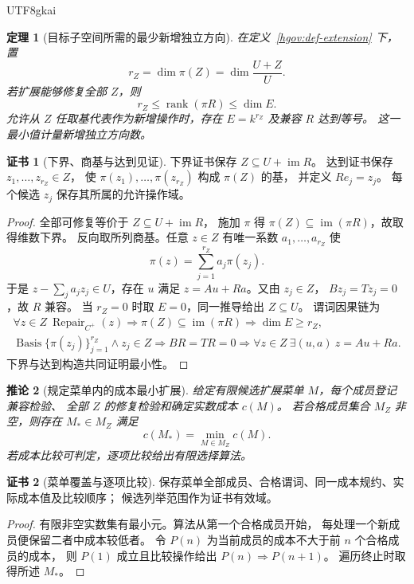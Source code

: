 \documentclass[12pt,a4paper,openany,notitlepage]{report}
\theoremstyle{plain}
\newtheorem{theorem}{定理}[chapter]
\newtheorem{corollary}[theorem]{推论}
\theoremstyle{definition}
\newtheorem*{certificate}{证书}
\theoremstyle{remark}
\def\mathcal#1{#1}\def\mathsf#1{#1}\def\mathbb#1{#1}%
\begin{document}
\begin{CJK*}{UTF8}{gkai}
\begin{theorem}[目标子空间所需的最少新增独立方向]
\label{hgov:thm-minimal-extension}
在定义~\ref{hgov:def-extension} 下，置
\[
 r_Z=\dim\pi(Z)
 =\dim\frac{U+Z}{U}.
\]
若扩展能够修复全部 $Z$，则
\[
 r_Z\le\operatorname{rank}(\pi R)\le\dim E.
\]
允许从 $Z$ 任取基代表作为新增操作时，存在
$E=\mathbb k^{r_Z}$ 及兼容 $R$ 达到等号。
这一最小值计量新增独立方向数。
\end{theorem}
\begin{certificate}[下界、商基与达到见证]
下界证书保存 $Z\subseteq U+\operatorname{im}R$。
达到证书保存 $z_1,\ldots,z_{r_Z}\in Z$，
使 $\pi(z_1),\ldots,\pi(z_{r_Z})$ 构成 $\pi(Z)$ 的基，
并定义 $Re_j=z_j$。
每个候选 $z_j$ 保存其所属的允许操作域。
\end{certificate}
\begin{proof}
全部可修复等价于 $Z\subseteq U+\operatorname{im}R$，
施加 $\pi$ 得
$\pi(Z)\subseteq\operatorname{im}(\pi R)$，故取得维数下界。
反向取所列商基。任意 $z\in Z$ 有唯一系数
$a_1,\ldots,a_{r_Z}$ 使
\[
 \pi(z)=\sum_{j=1}^{r_Z}a_j\pi(z_j).
\]
于是 $z-\sum_j a_jz_j\in U$，存在 $u$ 满足
$z=Au+Ra$。又由 $z_j\in Z$，
$Bz_j=Tz_j=0$，故 $R$ 兼容。
当 $r_Z=0$ 时取 $E=0$，同一推导给出 $Z\subseteq U$。
谓词因果链为
\[
 \begin{gathered}
 \forall z\in Z\ \operatorname{Repair}_{C^+}(z)
 \Longrightarrow
 \pi(Z)\subseteq\operatorname{im}(\pi R)
 \Longrightarrow \dim E\ge r_Z,\\
 \operatorname{Basis}\{\pi(z_j)\}_{j=1}^{r_Z}
 \wedge z_j\in Z
 \Longrightarrow BR=TR=0
 \Longrightarrow
 \forall z\in Z\ \exists(u,a)\ z=Au+Ra.
 \end{gathered}
\]
下界与达到构造共同证明最小性。
\end{proof}

\begin{corollary}[规定菜单内的成本最小扩展]
\label{hgov:cor-finite-cost}
给定有限候选扩展菜单 $\mathcal M$，每个成员登记兼容检验、
全部 $Z$ 的修复检验和确定实数成本 $c(M)$。
若合格成员集合 $\mathcal M_Z$ 非空，则存在
$M_*\in\mathcal M_Z$ 满足
\[
 c(M_*)=\min_{M\in\mathcal M_Z}c(M).
\]
若成本比较可判定，逐项比较给出有限选择算法。
\end{corollary}
\begin{certificate}[菜单覆盖与逐项比较]
保存菜单全部成员、合格谓词、同一成本规约、实际成本值及比较顺序；
候选列举范围作为证书有效域。
\end{certificate}
\begin{proof}
有限非空实数集有最小元。算法从第一个合格成员开始，
每处理一个新成员便保留二者中成本较低者。
令 $P(n)$ 为当前成员的成本不大于前 $n$ 个合格成员的成本，
则 $P(1)$ 成立且比较操作给出 $P(n)\Rightarrow P(n+1)$。
遍历终止时取得所述 $M_*$。
\end{proof}



\end{CJK*}
\end{document}
